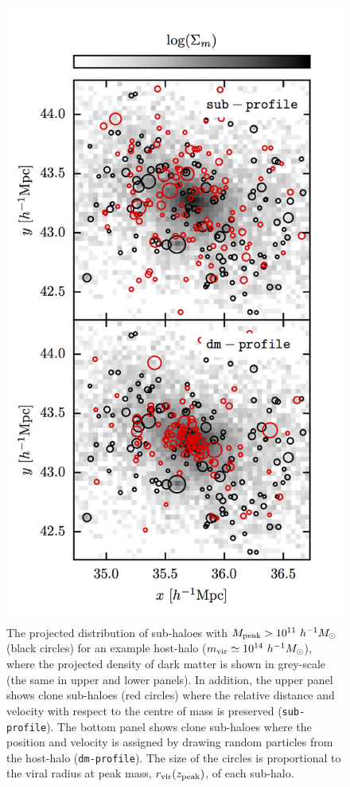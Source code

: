 \documentclass[useAMS,fleqn,usenatbib]{mnras}
\begin{document}
%
\begin{figure}
\includegraphics[width=\columnwidth]{figures/subhalo_positions.png}
\caption{The projected distribution of sub-haloes with $M_{\rm peak}>10^{11}~h^{-1}M_{\odot}$ (black circles) for an example host-halo ($m_{\rm vir}\simeq 10^{14}~h^{-1}M_{\odot}$), where the projected density of dark matter is shown in grey-scale (the same in upper and lower panels).  In addition, the upper panel shows clone sub-haloes (red circles) where the relative distance and velocity with respect to the centre of mass is preserved ({\tt sub-profile}).  The bottom panel shows clone sub-haloes where the position and velocity is assigned by drawing random particles from the host-halo ({\tt dm-profile}).  The size of the circles is proportional to the viral radius at peak mass, $r_{\rm vir}(z_{\rm peak})$, of each sub-halo.}
\label{fig:subhalo_positions}
\end{figure}
%
\end{document}
